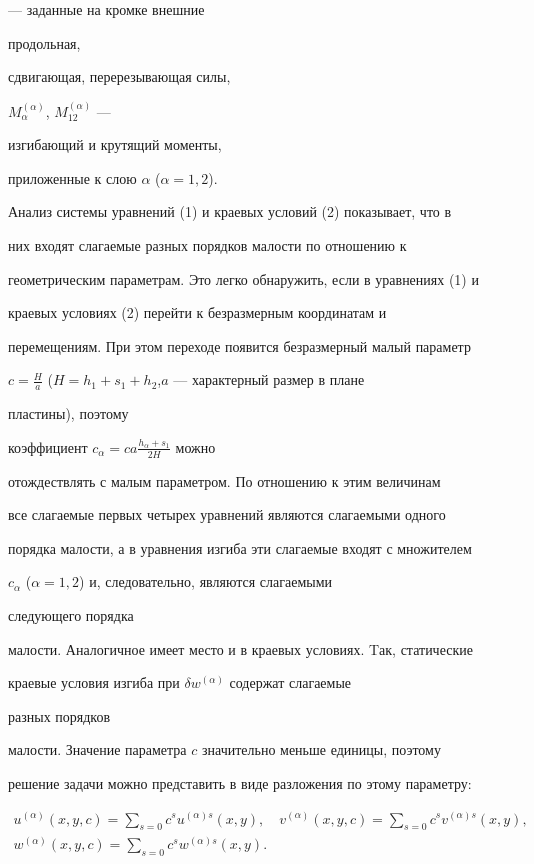 --- заданные на кромке внешние 


продольная, 


сдвигающая, перерезывающая силы,


$M^{(\alpha)}_\alpha$, $M^{(\alpha)}_{12}$ ---


изгибающий и крутящий моменты, 


приложенные к слою $\alpha$ ($\alpha=1,2$). 


 


Анализ системы уравнений (1) и краевых условий (2) показывает, что в 


них входят слагаемые разных порядков малости по отношению к 


геометрическим параметрам. Это легко обнаружить, если в уравнениях (1) и 


краевых условиях (2) перейти к безразмерным координатам и 


перемещениям. При этом переходе появится безразмерный малый параметр 


$c=\frac{H}{a}$ ($H=h_1+s_1+h_2$,\linebreak $a$ --- характерный размер в плане 


пластины), поэтому 


коэффициент $c_\alpha=ca\frac{h_\alpha+s_1}{2H}$ можно 


отождествлять с малым параметром. По отношению к этим величинам 


все слагаемые первых четырех уравнений являются слагаемыми одного 


порядка малости, а в уравнения изгиба эти слагаемые входят с множителем 


$c_\alpha$ ($\alpha=1,2$) и, следовательно, являются слагаемыми 


следующего порядка 


малости. Аналогичное имеет место и в краевых условиях. Tак, статические 


краевые условия изгиба при $\delta w^{(\alpha)}$ содержат слагаемые 


разных порядков 


малости. Значение параметра $c$ значительно меньше единицы, поэтому 


решение задачи можно представить в виде разложения по этому параметру: 


\begin{equation} 


\begin{array}{c} 


u^{(\alpha)}(x,y,c)=\displaystyle\sum_{s=0}c^s u^{(\alpha)s} 


(x,y),\quad v^{(\alpha)}(x,y,c)= 


\displaystyle\sum_{s=0}c^s v^{(\alpha)s}(x,y),\\[3mm] 


% 


w^{(\alpha)}(x,y,c)=\displaystyle\sum_{s=0} 


c^s w^{(\alpha)s}(x,y). 


\end{array} 


\end{equation} 


